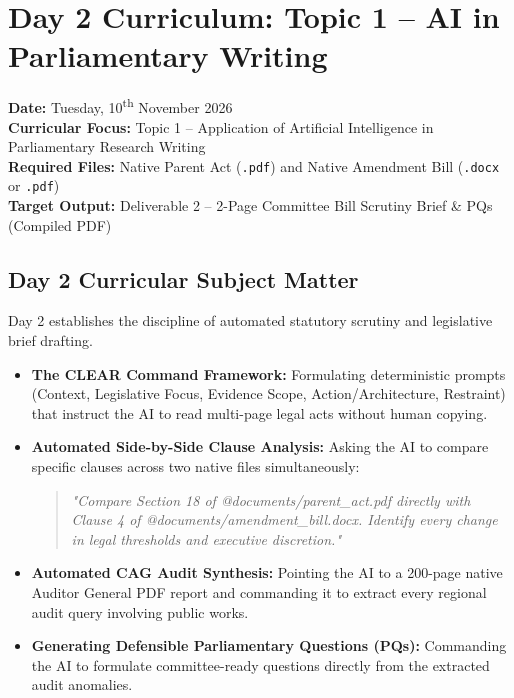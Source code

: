 \documentclass[11pt, a4paper]{report}
\begin{document}
\newpage

\chapter{Day 2 Curriculum: Topic 1 -- AI in Parliamentary Writing}
\textbf{Date:} Tuesday, 10\textsuperscript{th} November 2026\\
\textbf{Curricular Focus:} Topic 1 -- Application of Artificial Intelligence in Parliamentary Research Writing\\
\textbf{Required Files:} Native Parent Act (\texttt{.pdf}) and Native Amendment Bill (\texttt{.docx} or \texttt{.pdf})\\
\textbf{Target Output:} Deliverable 2 -- 2-Page Committee Bill Scrutiny Brief \& PQs (Compiled PDF)

\section{Day 2 Curricular Subject Matter}
Day 2 establishes the discipline of automated statutory scrutiny and legislative brief drafting.
\begin{itemize}[label=-]
    \item \textbf{The CLEAR Command Framework:} Formulating deterministic prompts (Context, Legislative Focus, Evidence Scope, Action/Architecture, Restraint) that instruct the AI to read multi-page legal acts without human copying.
    \item \textbf{Automated Side-by-Side Clause Analysis:} Asking the AI to compare specific clauses across two native files simultaneously:
    \begin{quote}
        \small\textit{"Compare Section 18 of @documents/parent\_act.pdf directly with Clause 4 of @documents/amendment\_bill.docx. Identify every change in legal thresholds and executive discretion."}
    \end{quote}
    \item \textbf{Automated CAG Audit Synthesis:} Pointing the AI to a 200-page native Auditor General PDF report and commanding it to extract every regional audit query involving public works.
    \item \textbf{Generating Defensible Parliamentary Questions (PQs):} Commanding the AI to formulate committee-ready questions directly from the extracted audit anomalies.
\end{itemize}
\end{document}

